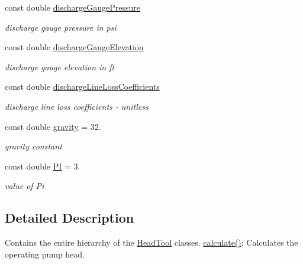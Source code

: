 \begin{DoxyCompactItemize}
\mbox{\label{class_head_tool_base_a39c854f13b16967e02a67cd1aaee07c4}} 
const double \hyperlink{class_head_tool_base_a39c854f13b16967e02a67cd1aaee07c4}{discharge\+Gauge\+Pressure}
\begin{DoxyCompactList}\small\item\em discharge gauge pressure in psi \end{DoxyCompactList}\item 
\mbox{\label{class_head_tool_base_a9ed2160992f8da2e335d919cf9aedd08}} 
const double \hyperlink{class_head_tool_base_a9ed2160992f8da2e335d919cf9aedd08}{discharge\+Gauge\+Elevation}
\begin{DoxyCompactList}\small\item\em discharge gauge elevation in ft \end{DoxyCompactList}\item 
\mbox{\label{class_head_tool_base_a147c035c7422406c594c5fd42ab11eb0}} 
const double \hyperlink{class_head_tool_base_a147c035c7422406c594c5fd42ab11eb0}{discharge\+Line\+Loss\+Coefficients}
\begin{DoxyCompactList}\small\item\em discharge line loss coefficients -\/ unitless \end{DoxyCompactList}\item 
\mbox{\label{class_head_tool_base_a687da90a9c2f44cb51061d9fad30c002}} 
const double \hyperlink{class_head_tool_base_a687da90a9c2f44cb51061d9fad30c002}{gravity} = 32.
\begin{DoxyCompactList}\small\item\em gravity constant \end{DoxyCompactList}\item 
\mbox{\label{class_head_tool_base_a1ed53b699c7d247b2ee13bd4e8493c9c}} 
const double \hyperlink{class_head_tool_base_a1ed53b699c7d247b2ee13bd4e8493c9c}{PI} = 3.
\begin{DoxyCompactList}\small\item\em value of Pi \end{DoxyCompactList}\end{DoxyCompactItemize}


\subsection{Detailed Description}
Contains the entire hierarchy of the \hyperlink{class_head_tool}{Head\+Tool} classes. \hyperlink{class_head_tool_base_ab8df8f908827ce45dc5e769ea0e10f0b}{calculate()}\+: Calculates the operating pump head. 

